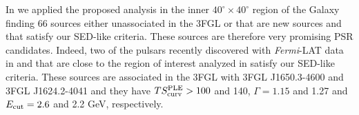 \documentclass[12pt,twoside,letterpaper,onecolumn,english]{article}
\begin{document}
In \cite{Fermi-LAT:2017yoi} we applied the proposed analysis in the inner $40^{\circ} \times 40^{\circ}$ region of the Galaxy finding 66 sources either unassociated in the 3FGL or that are new sources and that satisfy our SED-like criteria.
These sources are therefore very promising PSR candidates.
Indeed, two of the pulsars recently discovered with {\it Fermi}-LAT data in \cite{Clark:2016unw} and that are close to the region of interest analyzed in \cite{Fermi-LAT:2017yoi} satisfy our SED-like criteria.
These sources are associated in the 3FGL with 3FGL J1650.3-4600 and 3FGL J1624.2-4041 and they have $TS^{\rm{PLE}}_{\rm{curv}}>100$ and 140, $\Gamma=1.15$ and 1.27 and $E_{\rm{cut}}=2.6$ and 2.2 GeV, respectively.
\end{document}
